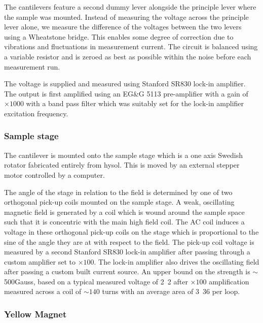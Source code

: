 The cantilevers feature a second dummy lever alongside the principle lever where the sample was mounted. Instead of measuring the voltage across the principle lever alone, we measure the difference of the voltages between the two levers using a Wheatstone bridge. This enables some degree of correction due to vibrations and fluctuations in measurement current. The circuit is balanced using a variable resistor and is zeroed as best as possible within the noise before each measurement run.

The voltage is supplied and measured using Stanford SR830 lock-in amplifier. The output is first amplified using an EG\&G 5113 pre-amplifier with a gain of $\times1000$ with a band pass filter which was suitably set for the lock-in amplifier excitation frequency.

\subsubsection{Sample stage}

The cantilever is mounted onto the sample stage which is a one axis Swedish rotator fabricated entirely from hysol. This is moved by an external stepper motor controlled by a computer. 

The angle of the stage in relation to the field is determined by one of two orthogonal pick-up coils mounted on the sample stage. A weak, oscillating magnetic field is generated by a coil which is wound around the sample space such that it is concentric with the main high field coil. The AC coil induces a voltage in these orthogonal pick-up coils on the stage which is proportional to the sine of the angle they are at with respect to the field. The pick-up coil voltage is measured by a second Stanford SR830 lock-in amplifier after passing through a custom amplifier set to $\times100$. The lock-in amplifier also drives the oscillating field after passing a custom built current source. An upper bound on the strength is $\sim$\unit{500}{\textrm{Gauss}}, based on a typical measured voltage of \unit{2.2}{\milli\volt} after $\times100$ amplification measured across a coil of $\sim140$ turns with an average area of \unit{3.36}{\milli\metre\squared} per loop.

\subsubsection{Yellow Magnet}

